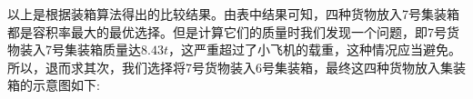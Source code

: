 \documentclass{article}
\begin{document}
	以上是根据装箱算法得出的比较结果。由表中结果可知，四种货物放入7号集装箱都是容积率最大的最优选择。但是计算它们的质量时我们发现一个问题，即7号货物装入7号集装箱质量达$8.43t$，这严重超过了小飞机的载重，这种情况应当避免。所以，退而求其次，我们选择将7号货物装入6号集装箱，最终这四种货物放入集装箱的示意图如下:
	\begin{figure}[!h]
		\centering 
	\end{figure}
	
	\newpage
\end{document}
